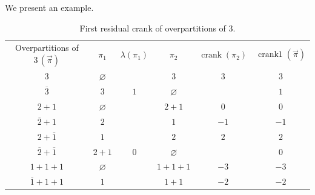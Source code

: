 \documentclass[pdftex]{sigma}
\numberwithin{equation}{section}
\begin{document}
We present an example.
\begin{table}[hbt!]\centering
\caption{First residual crank of overpartitions of $3$.}\label{t1}
\vspace{2mm}
\begin{tabular}{ c c c c c c }
Overpartitions of $3\,(\vec{\pi})$ & $\pi_1$ & $\lambda(\pi_1)$ & $\pi_2$ & $\operatorname{crank}(\pi_2)$ & $\operatorname{crank1}(\vec{\pi})$ \\
 $3$                         & $\varnothing$ &     &  $3$   & $3$ & $3$\\
 $\overline{3}$              & $3$    & $1$ & $\varnothing$ &     & $1$\\
 $2+1$                       & $\varnothing$ &     & $2+1$  & $0$ & $0$\\
 $\overline{2}+1$            & $2$    &     &  $1$   & \hspace{-3mm}$-1$& \hspace{-3mm}$-1$\\
 $2+\overline{1}$            & $1$    &     &  $2$   & $2$ & $2$\\
 $\overline{2}+\overline{1}$ & $2+1$  & $0$ & $\varnothing$ &     & $0$\\
 $1+1+1$                     & $\varnothing$ &     & $1+1+1$& \hspace{-3mm}$-3$& \hspace{-3mm}$-3$\\
 $\overline{1}+1+1$          & $1$    &     & $1+1$  & \hspace{-3mm}$-2$& \hspace{-3mm}$-2$
\end{tabular}
\end{table}
\end{document}
